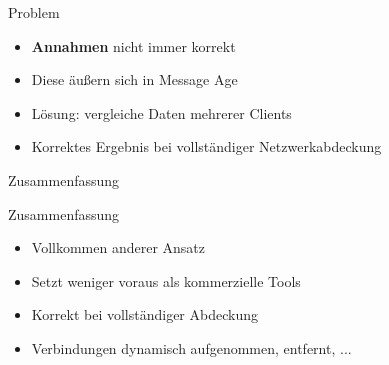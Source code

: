 \documentclass{beamer}
\begin{document}
\begin{frame}{Problem}
    \begin{itemize}[<+->]
        \item \textbf{Annahmen} nicht immer korrekt
        \item Diese äußern sich in Message Age
        \item Lösung: vergleiche Daten mehrerer Clients
        \item Korrektes Ergebnis bei vollständiger Netzwerkabdeckung
    \end{itemize}
\end{frame}

\begin{frame}{Zusammenfassung}
\end{frame}

\begin{frame}{Zusammenfassung}
    \begin{itemize}[<+->]
        \item Vollkommen anderer Ansatz
        \item Setzt weniger voraus als kommerzielle Tools
        \item Korrekt bei vollständiger Abdeckung
        \item Verbindungen dynamisch aufgenommen, entfernt, ...
    \end{itemize}
    \\
\end{frame}
\end{document}
